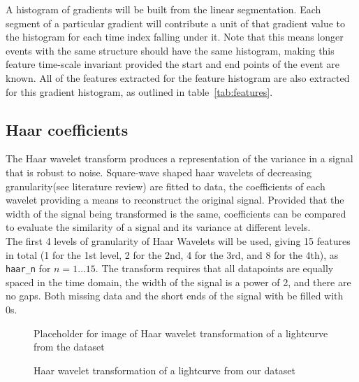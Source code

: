 	A histogram of gradients will be built from the linear segmentation. Each segment of a particular gradient will contribute a unit of that gradient value to the histogram for each time index falling under it. Note that this means longer events with the same structure should have the same histogram, making this feature time-scale invariant provided the start and end points of the event are known. All of the features extracted for the feature histogram are also extracted for this gradient histogram, as outlined in table~\ref{tab:features}.
	
	\subsection{Haar coefficients}
	The Haar wavelet transform produces a representation of the variance in a signal that is robust to noise. Square-wave shaped haar wavelets of decreasing granularity(see literature review) are fitted to data, the coefficients of each wavelet providing a means to reconstruct the original signal. Provided that the width of the signal being transformed is the same, coefficients can be compared to evaluate the similarity of a signal and its variance at different levels. \\
	The first 4 levels of granularity of Haar Wavelets will be used, giving 15 features in total (1 for the 1st level, 2 for the 2nd, 4 for the 3rd, and 8 for the 4th), as \verb#haar_n# for $n = 1 \ldots 15$. The transform requires that all datapoints are equally spaced in the time domain, the width of the signal is a power of 2, and there are no gaps. Both missing data and the short ends of the signal with be filled with 0s.
	
	\begin{figure}
		\label{fig:haarwaveletexample}
		\centering
		Placeholder for image of Haar wavelet transformation of a lightcurve from the dataset
		\caption{Haar wavelet transformation of a lightcurve from our dataset}
	\end{figure}
	
